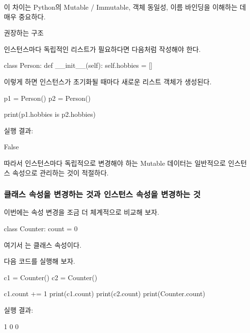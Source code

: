 이 차이는 Python의 Mutable / Immutable, 객체 동일성, 이름 바인딩을 이해하는 데 매우 중요하다.

\begin{dhknote}
\begin{dhksmry}[centered]
권장하는 구조
\end{dhksmry}
\end{dhknote}

인스턴스마다 독립적인 리스트가 필요하다면 다음처럼 작성해야 한다.

\begin{dhkcode}
class Person:
    def __init__(self):
        self.hobbies = []
\end{dhkcode}

이렇게 하면 인스턴스가 초기화될 때마다 새로운 리스트 객체가 생성된다.

\begin{dhkcode}
p1 = Person()
p2 = Person()

print(p1.hobbies is p2.hobbies)
\end{dhkcode}

실행 결과:

\begin{dhkzsh}
False
\end{dhkzsh}

따라서 인스턴스마다 독립적으로 변경해야 하는 Mutable 데이터는 일반적으로 인스턴스 속성으로 관리하는 것이 적절하다.

\subsubsection{클래스 속성을 변경하는 것과 인스턴스 속성을 변경하는 것}

이번에는 속성 변경을 조금 더 체계적으로 비교해 보자.

\begin{dhkcode}
class Counter:
    count = 0
\end{dhkcode}

여기서 는 클래스 속성이다.

다음 코드를 실행해 보자.

\begin{dhkcode}
c1 = Counter()
c2 = Counter()

c1.count += 1
print(c1.count)
print(c2.count)
print(Counter.count)
\end{dhkcode}

실행 결과:

\begin{dhkzsh}
1
0
0
\end{dhkzsh}

